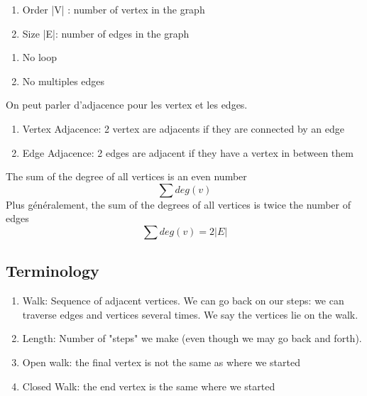 \documentclass{article}
\begin{document}
\begin{definition}
    \begin{enumerate}
	\item Order |V| : number of vertex in the graph
	\item Size |E|: number of edges in the graph
    \end{enumerate}
\end{definition}

\begin{definition}
    \begin{enumerate}
	\item No loop
	\item No multiples edges
    \end{enumerate}
\end{definition}

\begin{definition}[Adjacence]
    On peut parler d'adjacence pour les vertex et les edges.
    \begin{enumerate}
	\item Vertex Adjacence: 2 vertex are adjacents if they are
	    connected by an edge
	\item Edge Adjacence: 2 edges are adjacent if they have a
	    vertex in between them
    \end{enumerate}
\end{definition}

\begin{theorem}
    The sum of the degree of all vertices is an even number
    $$ \sum deg(v)$$
    Plus généralement, the sum of the degrees of all vertices is
    twice the number of edges
    $$ \sum deg(v) = 2 |E| $$
\end{theorem}

\subsection{Terminology}%
\label{ssub:Terminology}

\begin{definition}[Walk]
    \begin{enumerate}
	\item Walk: Sequence of adjacent vertices. We can go back on our
	    steps: we can traverse edges and vertices several times.
	    We say the vertices lie on the walk.
	\item Length: Number of "steps" we make (even though we may go
	    back and forth).
	\item Open walk: the final vertex is not the same as where we
	    started
	\item Closed Walk: the end vertex is the same where we started
    \end{enumerate}
\end{definition}
\end{document}
